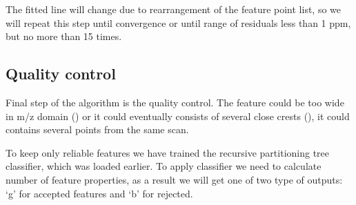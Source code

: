 \documentclass[]{article}
\begin{document}
The fitted line will change due to rearrangement of the feature point
list, so we will repeat this step until convergence or until range of
residuals less than 1 ppm, but no more than 15 times.

\subsection{Quality control}

Final step of the algorithm is the quality control. The feature could be
too wide in m/z domain () or it could eventually consists of several close
crests (), it could contains several points from the same scan. 

To keep only reliable features we have trained the recursive partitioning tree classifier, which was loaded earlier. 
To apply classifier we need to calculate number of feature properties, as a result we will get one of two type of outputs: 
`g' for accepted features and `b' for rejected. 
\end{document}

